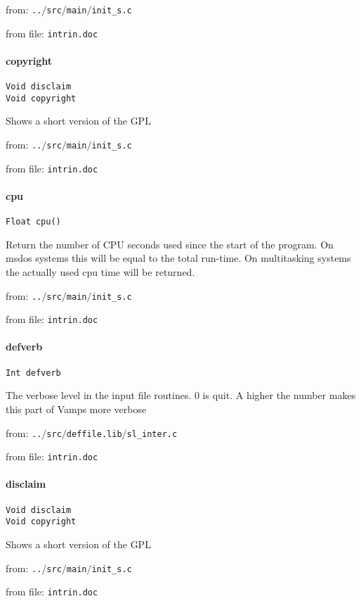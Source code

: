 from: {\tt ..$/$src$/$main$/$init\_s.c}

from file: {\tt intrin.doc}


\paragraph{copyright}
\begin{verbatim}
Void disclaim
Void copyright
\end{verbatim}
Shows a short version of the GPL 


from: {\tt ..$/$src$/$main$/$init\_s.c}

from file: {\tt intrin.doc}


\paragraph{cpu}
\begin{verbatim}
Float cpu()
\end{verbatim}
Return the number of CPU seconds used since the start of
the program. On msdos systems this will be equal to the
total run-time. On multitasking systems the actually used cpu time
will be returned.


from: {\tt ..$/$src$/$main$/$init\_s.c}

from file: {\tt intrin.doc}


\paragraph{defverb}
\begin{verbatim}
Int defverb
\end{verbatim}
The verbose level in the input file routines. 0 is quit. A higher
the number makes this part of Vamps more verbose 


from: {\tt ..$/$src$/$deffile.lib$/$sl\_inter.c}

from file: {\tt intrin.doc}


\paragraph{disclaim}
\begin{verbatim}
Void disclaim
Void copyright
\end{verbatim}
Shows a short version of the GPL 


from: {\tt ..$/$src$/$main$/$init\_s.c}

from file: {\tt intrin.doc}


